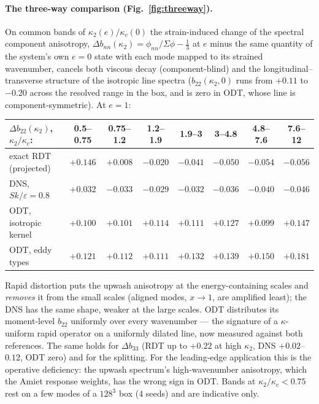 \documentclass[11pt,a4paper]{article}
\newcommand{\Ske}{Sk/\varepsilon}
\begin{document}
\paragraph{The three-way comparison (Fig.~\ref{fig:threeway}).} On common
bands of $\kappa_2(e)/\kappa_c(0)$ the strain-induced change of the
spectral component anisotropy,
$\Delta b_{nn}(\kappa_2)=\phi_{nn}/\Sigma\phi-\tfrac13$ at $e$ minus the
same quantity of the system's own $e=0$ state with each mode mapped to its
strained wavenumber, cancels both viscous decay (component-blind) and the
longitudinal--transverse structure of the isotropic line spectra
($b_{22}(\kappa_2,0)$ runs from $+0.11$ to $-0.20$ across the resolved
range in the box, and is zero in ODT, whose line is component-symmetric).
At $e=1$:
\begin{center}\small
\begin{tabular}{lccccccc}
\toprule
$\Delta b_{22}(\kappa_2)$, $\kappa_2/\kappa_c$: & 0.5--0.75 & 0.75--1.2 & 1.2--1.9 & 1.9--3 & 3--4.8 & 4.8--7.6 & 7.6--12\\
\midrule
exact RDT (projected) & $+0.146$ & $+0.008$ & $-0.020$ & $-0.041$ & $-0.050$ & $-0.054$ & $-0.056$\\
DNS, $\Ske=0.8$       & $+0.032$ & $-0.033$ & $-0.029$ & $-0.032$ & $-0.036$ & $-0.040$ & $-0.046$\\
ODT, isotropic kernel & $+0.100$ & $+0.101$ & $+0.114$ & $+0.111$ & $+0.127$ & $+0.099$ & $+0.147$\\
ODT, eddy types       & $+0.121$ & $+0.112$ & $+0.111$ & $+0.132$ & $+0.139$ & $+0.150$ & $+0.181$\\
\bottomrule
\end{tabular}
\end{center}
Rapid distortion puts the upwash anisotropy at the energy-containing
scales and \emph{removes} it from the small scales (aligned modes,
$x\to1$, are amplified least); the DNS has the same shape, weaker at the
large scales. ODT distributes its moment-level $b_{22}$ uniformly over
every wavenumber --- the signature of a $\kappa$-uniform rapid operator on
a uniformly dilated line, now measured against both references. The same
holds for $\Delta b_{33}$ (RDT up to $+0.22$ at high $\kappa_2$, DNS
$+0.02$--$0.12$, ODT zero) and for the splitting. For the leading-edge
application this is the operative deficiency: the upwash spectrum's
high-wavenumber anisotropy, which the Amiet response weights, has the wrong
sign in ODT. Bands at $\kappa_2/\kappa_c<0.75$ rest on a few modes of a
$128^3$ box (4 seeds) and are indicative only.
\end{document}
